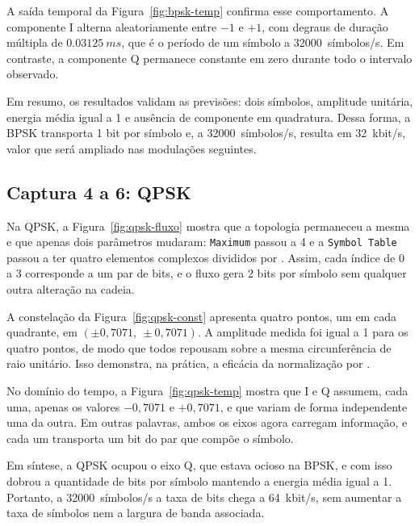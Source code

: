 A saída temporal da Figura~\ref{fig:bpsk-temp} confirma esse comportamento. A componente I alterna aleatoriamente entre $-1$ e $+1$, com degraus de duração múltipla de $\SI{0,03125}{ms}$, que é o período de um símbolo a \num{32000}~símbolos/s. Em contraste, a componente Q permanece constante em zero durante todo o intervalo observado.


Em resumo, os resultados validam as previsões: dois símbolos, amplitude unitária, energia média igual a 1 e ausência de componente em quadratura. Dessa forma, a BPSK transporta 1 bit por símbolo e, a \num{32000}~símbolos/s, resulta em \SI{32}{kbit/s}, valor que será ampliado nas modulações seguintes.

\subsection{Captura 4 a 6: QPSK}

Na QPSK, a Figura~\ref{fig:qpsk-fluxo} mostra que a topologia permaneceu a mesma e que apenas dois parâmetros mudaram: \texttt{Maximum} passou a 4 e a \texttt{Symbol Table} passou a ter quatro elementos complexos divididos por . Assim, cada índice de 0 a 3 corresponde a um par de bits, e o fluxo gera 2 bits por símbolo sem qualquer outra alteração na cadeia.


A constelação da Figura~\ref{fig:qpsk-const} apresenta quatro pontos, um em cada quadrante, em $(\pm0{,}7071,\ \pm0{,}7071)$. A amplitude medida foi igual a 1 para os quatro pontos, de modo que todos repousam sobre a mesma circunferência de raio unitário. Isso demonstra, na prática, a eficácia da normalização por .


No domínio do tempo, a Figura~\ref{fig:qpsk-temp} mostra que I e Q assumem, cada uma, apenas os valores $-0{,}7071$ e $+0{,}7071$, e que variam de forma independente uma da outra. Em outras palavras, ambos os eixos agora carregam informação, e cada um transporta um bit do par que compõe o símbolo.


Em síntese, a QPSK ocupou o eixo Q, que estava ocioso na BPSK, e com isso dobrou a quantidade de bits por símbolo mantendo a energia média igual a 1. Portanto, a \num{32000}~símbolos/s a taxa de bits chega a \SI{64}{kbit/s}, sem aumentar a taxa de símbolos nem a largura de banda associada.

